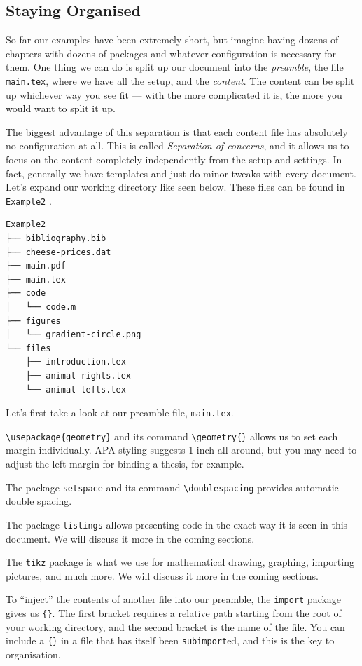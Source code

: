 \subsection{Staying Organised}
So far our examples have been extremely short, but imagine having dozens of chapters with dozens of packages and whatever configuration is necessary for them.
One thing we can do is split up our document into the \emph{preamble}, the file \verb|main.tex|, where we have all the setup, and the \emph{content}.
The content can be split up whichever way you see fit --- with the more complicated it is, the more you would want to split it up. 

The biggest advantage of this separation is that each content file has absolutely no configuration at all.
This is called \emph{Separation of concerns}, and it allows us to focus on the content completely independently from the setup and settings.
In fact, generally we have templates and just do minor tweaks with every document.
\clearpage
Let's expand our working directory like seen below. These files can be found in \verb|Example2| .
\begin{verbatim}
Example2
├── bibliography.bib
├── cheese-prices.dat
├── main.pdf
├── main.tex
├── code
│   └── code.m
├── figures
│   └── gradient-circle.png
└── files
    ├── introduction.tex
    ├── animal-rights.tex
    └── animal-lefts.tex
\end{verbatim}

Let's first take a look at our preamble file, \verb|main.tex|.



\verb|\usepackage{geometry}| and its command \verb|\geometry{}| allows us to set each margin individually.
APA styling suggests 1 inch all around, but you may need to adjust the left margin for binding a thesis, for example.

The package \verb|setspace| and its command \verb|\doublespacing| provides automatic double spacing.

The package \verb|listings| allows presenting code in the exact way it is seen in this document. We will discuss it more in the coming sections.

The \verb|tikz| package is what we use for mathematical drawing, graphing, importing pictures, and much more.
We will discuss it more in the coming sections.

To ``inject'' the contents of another file into our preamble, the \verb|import| package gives us \verb|{}|.
The first bracket requires a relative path starting from the root of your working directory, and the second bracket is the name of the file.
You can include a \verb|{}| in a file that has itself been \texttt{subimport}ed, and this is the key to organisation.

